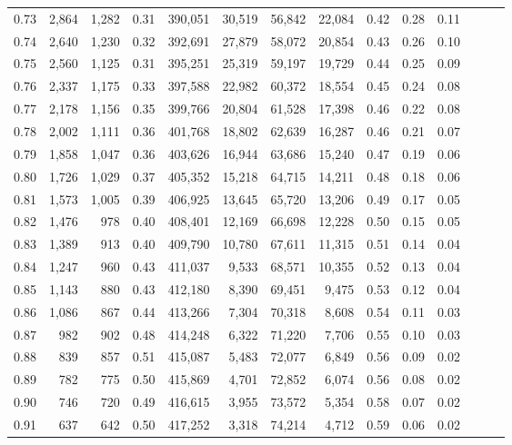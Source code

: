 \begin{tabular}{rrrrrrrrrrrrrr}
0.73 &  2,864 &  1,282 &  0.31 &  390,051 &   30,519 &  56,842 &  22,084 &  0.42 &  0.28 &      0.11 \\
0.74 &  2,640 &  1,230 &  0.32 &  392,691 &   27,879 &  58,072 &  20,854 &  0.43 &  0.26 &      0.10 \\
0.75 &  2,560 &  1,125 &  0.31 &  395,251 &   25,319 &  59,197 &  19,729 &  0.44 &  0.25 &      0.09 \\
0.76 &  2,337 &  1,175 &  0.33 &  397,588 &   22,982 &  60,372 &  18,554 &  0.45 &  0.24 &      0.08 \\
0.77 &  2,178 &  1,156 &  0.35 &  399,766 &   20,804 &  61,528 &  17,398 &  0.46 &  0.22 &      0.08 \\
0.78 &  2,002 &  1,111 &  0.36 &  401,768 &   18,802 &  62,639 &  16,287 &  0.46 &  0.21 &      0.07 \\
0.79 &  1,858 &  1,047 &  0.36 &  403,626 &   16,944 &  63,686 &  15,240 &  0.47 &  0.19 &      0.06 \\
0.80 &  1,726 &  1,029 &  0.37 &  405,352 &   15,218 &  64,715 &  14,211 &  0.48 &  0.18 &      0.06 \\
0.81 &  1,573 &  1,005 &  0.39 &  406,925 &   13,645 &  65,720 &  13,206 &  0.49 &  0.17 &      0.05 \\
0.82 &  1,476 &    978 &  0.40 &  408,401 &   12,169 &  66,698 &  12,228 &  0.50 &  0.15 &      0.05 \\
0.83 &  1,389 &    913 &  0.40 &  409,790 &   10,780 &  67,611 &  11,315 &  0.51 &  0.14 &      0.04 \\
0.84 &  1,247 &    960 &  0.43 &  411,037 &    9,533 &  68,571 &  10,355 &  0.52 &  0.13 &      0.04 \\
0.85 &  1,143 &    880 &  0.43 &  412,180 &    8,390 &  69,451 &   9,475 &  0.53 &  0.12 &      0.04 \\
0.86 &  1,086 &    867 &  0.44 &  413,266 &    7,304 &  70,318 &   8,608 &  0.54 &  0.11 &      0.03 \\
0.87 &    982 &    902 &  0.48 &  414,248 &    6,322 &  71,220 &   7,706 &  0.55 &  0.10 &      0.03 \\
0.88 &    839 &    857 &  0.51 &  415,087 &    5,483 &  72,077 &   6,849 &  0.56 &  0.09 &      0.02 \\
0.89 &    782 &    775 &  0.50 &  415,869 &    4,701 &  72,852 &   6,074 &  0.56 &  0.08 &      0.02 \\
0.90 &    746 &    720 &  0.49 &  416,615 &    3,955 &  73,572 &   5,354 &  0.58 &  0.07 &      0.02 \\
0.91 &    637 &    642 &  0.50 &  417,252 &    3,318 &  74,214 &   4,712 &  0.59 &  0.06 &      0.02 \\

\end{tabular}
